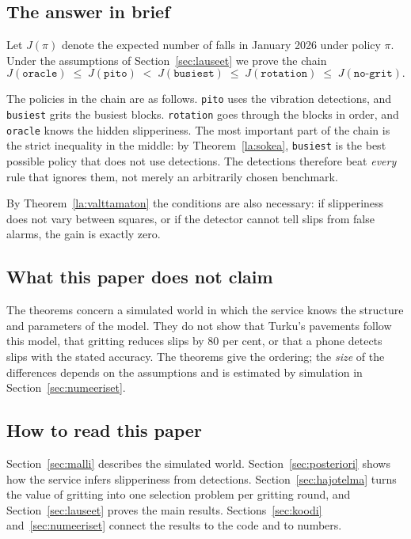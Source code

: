 \documentclass[11pt,a4paper]{article}
\theoremstyle{plain}
\theoremstyle{definition}
\theoremstyle{remark}
\newcommand{\1}{\mathbf{1}}
\newcommand{\pol}[1]{\texttt{#1}}
\begin{document}
\subsection{The answer in brief}

Let $J(\pi)$ denote the expected number of falls in January 2026 under policy
$\pi$. Under the assumptions of Section~\ref{sec:lauseet} we prove the chain
\begin{equation*}
  J(\pol{oracle}) \;\le\; J(\pol{pito}) \;<\; J(\pol{busiest})
  \;\le\; J(\pol{rotation}) \;\le\; J(\pol{no-grit}).
\end{equation*}

The policies in the chain are as follows. \pol{pito} uses the vibration
detections, and \pol{busiest} grits the busiest blocks. \pol{rotation} goes
through the blocks in order, and \pol{oracle} knows the hidden slipperiness. The
most important part of the chain is the strict inequality in the middle: by
Theorem~\ref{la:sokea}, \pol{busiest} is the best possible policy that does not
use detections. The detections therefore beat \emph{every} rule that ignores
them, not merely an arbitrarily chosen benchmark.

By Theorem~\ref{la:valttamaton} the conditions are also necessary: if
slipperiness does not vary between squares, or if the detector cannot tell slips
from false alarms, the gain is exactly zero.

\subsection{What this paper does not claim}

The theorems concern a simulated world in which the service knows the structure
and parameters of the model. They do not show that Turku's pavements follow this
model, that gritting reduces slips by 80 per cent, or that a phone detects slips
with the stated accuracy. The theorems give the ordering; the \emph{size} of the
differences depends on the assumptions and is estimated by simulation in
Section~\ref{sec:numeeriset}.

\subsection{How to read this paper}

Section~\ref{sec:malli} describes the simulated world.
Section~\ref{sec:posteriori} shows how the service infers slipperiness from
detections. Section~\ref{sec:hajotelma} turns the value of gritting into one
selection problem per gritting round, and Section~\ref{sec:lauseet} proves the
main results. Sections~\ref{sec:koodi} and~\ref{sec:numeeriset} connect the
results to the code and to numbers.
\end{document}
